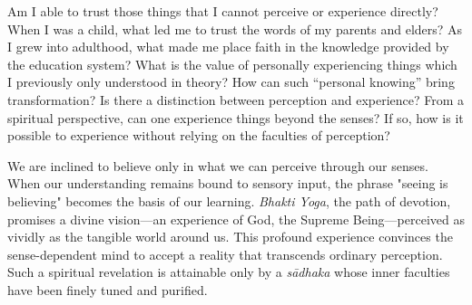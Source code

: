\newpage
\begin{mananam}{}
\normalfont\mananamtext Am I able to trust those things that I cannot perceive or experience directly? When I was a child, what led me to trust the words of my parents and elders? As I grew into adulthood, what made me place faith in the knowledge provided by the education system?
What is the value of personally experiencing things which I previously only understood in theory? How can such “personal knowing” bring transformation? 
Is there a distinction between perception and experience? From a spiritual perspective, can one experience things beyond the senses? If so, how is it possible to experience without relying on the faculties of perception?
\end{mananam}
\sreflect
\begin{inspiration}{}
\normalfont\mananamtext We are inclined to believe only in what we can perceive through our senses. When our understanding remains bound to sensory input, the phrase "seeing is believing" becomes the basis of our learning. \emph{Bhakti Yoga}, the path of devotion, promises a divine vision—an experience of God, the Supreme Being—perceived as vividly as the tangible world around us. This profound experience convinces the sense-dependent mind to accept a reality that transcends ordinary perception. Such a spiritual revelation is attainable only by a \emph{sādhaka} whose inner faculties have been finely tuned and purified.
\end{inspiration}
\newpage


